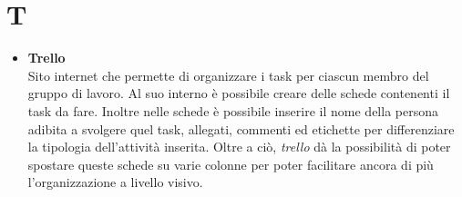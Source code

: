 \chapter{T} \label{T}
	\begin{itemize}
		\item \textbf{Trello}\\
		Sito internet che permette di organizzare i task per ciascun membro del gruppo di lavoro.
		Al suo interno è possibile creare delle schede contenenti il task da fare.
		Inoltre nelle schede è possibile inserire il nome della persona adibita a svolgere quel task, allegati, commenti ed etichette per differenziare la tipologia dell'attività inserita.
		Oltre a ciò, \textit{trello} dà la possibilità di poter spostare queste schede su varie colonne per poter facilitare ancora di più l'organizzazione a livello visivo.
	\end{itemize}